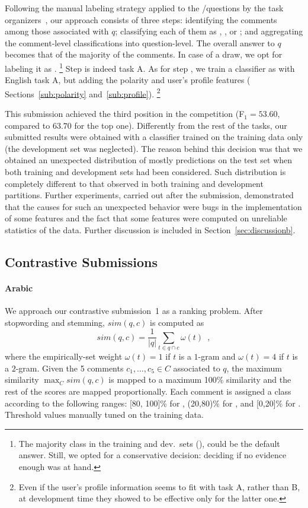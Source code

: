 Following the manual labeling strategy applied to the \yes/\no questions by the 
task organizers~\cite{Marquez-EtAl:2015:SemEval}, our approach consists of three 
steps:
\Ni identifying the \good comments among those associated with $q$;
\Nii classifying each of them as \yes, \no, or \unsure; and 
\Niii aggregating the comment-level classifications into question-level. The 
overall answer to $q$ becomes that of the majority of the comments. In case of a
draw, we opt for labeling it as \unsure.%
\footnote{The majority class in the training and dev.\ sets (\yes), could be the default 
answer. Still, we opted for a conservative decision: deciding 
\unsure if no evidence enough was at hand.}
Step \Ni is indeed task A. As for step \Nii, we train a classifier as with English task A, 
but adding the polarity and user's profile features (\cf 
Sections~\ref{sub:polarity} and~\ref{sub:profile}).%
\footnote{Even if the user's profile information seems to fit with task A, 
rather than B, at development time they showed to be effective only for the 
latter one.}

This submission achieved the third position in the competition (F$_1=53.60$, 
compared to $63.70$ for the top one). Differently from the rest of the tasks, our 
submitted results were obtained with a classifier trained on the training data 
only (the development set was neglected). The reason behind this decision was 
that we obtained an unexpected distribution of mostly \yes predictions on the 
test set when both training and development sets had been considered. Such 
distribution is completely different to that observed in both training and 
development partitions. Further experiments, carried out after the submission, 
demonstrated that the causes for such an unexpected behavior were bugs in the 
implementation of some features and the fact that some features were computed on 
unreliable statistics of the data. Further discussion is included in 
Section~\ref{sec:discussionb}.


\subsection{Contrastive Submissions}
\label{sub:contrastive}

\paragraph{Arabic} 

We approach our contrastive submission~1 as a ranking problem. After 
stopwording and stemming, $sim(q,c)$ is computed as 
\begin{equation}
 sim(q,c) = \frac{1}{|q|} \sum_{t\in q\cap c} \omega(t) \enspace ,
 \label{eq:overlap}
\end{equation}
% 
where the empirically-set weight $\omega(t)=1$ if $t$ is a $1$-gram and 
$\omega(t)=4$ if $t$ is a $2$-gram. Given the 5 comments $c_1,\ldots,c_5\in C$ 
associated to $q$, the maximum similarity $\max_C sim(q,c)$ is mapped to a 
maximum 100\% similarity and the rest of the scores are mapped proportionally. 
Each comment is assigned a class according to the following ranges: [80, 100]\% 
for \dir, (20,80)\% for \rel, and [0,20]\% for \irel. Threshold values manually 
tuned on the training data.



